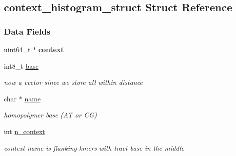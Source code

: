 \hypertarget{structcontext__histogram__struct}{}\subsection{context\+\_\+histogram\+\_\+struct Struct Reference}
\label{structcontext__histogram__struct}
\subsubsection*{Data Fields}
\begin{DoxyCompactItemize}
\item 
\mbox{\label{structcontext__histogram__struct_aec81e9749874d51b633f900620f1e3e9}} 
uint64\+\_\+t $\ast$ {\bfseries context}
\item 
\mbox{\label{structcontext__histogram__struct_a296cf58a12c2ea8604e62e2401c6c283}} 
int8\+\_\+t \hyperlink{structcontext__histogram__struct_a296cf58a12c2ea8604e62e2401c6c283}{base}
\begin{DoxyCompactList}\small\item\em now a vector since we store all within distance \end{DoxyCompactList}\item 
\mbox{\label{structcontext__histogram__struct_ab51cec3be807d3531eb30864282f6dc4}} 
char $\ast$ \hyperlink{structcontext__histogram__struct_ab51cec3be807d3531eb30864282f6dc4}{name}
\begin{DoxyCompactList}\small\item\em homopolymer base (AT or CG) \end{DoxyCompactList}\item 
\mbox{\label{structcontext__histogram__struct_a899b6aba794f0507d258278891c3a275}} 
int \hyperlink{structcontext__histogram__struct_a899b6aba794f0507d258278891c3a275}{n\+\_\+context}
\begin{DoxyCompactList}\small\item\em context name is flanking kmers with tract base in the middle \end{DoxyCompactList}\item 
\mbox{\label{structcontext__histogram__struct_aa2663ec4a4eaa334093034c756fb6fa6}} 

\end{DoxyCompactItemize}

